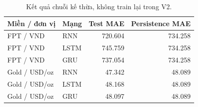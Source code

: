 \par\FloatBarrier\begin{table}[H]\centering\small{}\setlength{\tabcolsep}{5pt}
\caption{Kết quả chuỗi kế thừa, không train lại trong V2.}\begin{tabular}{llrr}\toprule
Miền / đơn vị & Mạng & Test MAE & Persistence MAE\\\midrule
FPT / VND & RNN & 720.604 & 734.258\\
FPT / VND & LSTM & 745.759 & 734.258\\
FPT / VND & GRU & 737.054 & 734.258\\
Gold / USD/oz & RNN & 47.342 & 48.089\\
Gold / USD/oz & LSTM & 48.168 & 48.089\\
Gold / USD/oz & GRU & 48.097 & 48.089\\\bottomrule\end{tabular}\end{table}
